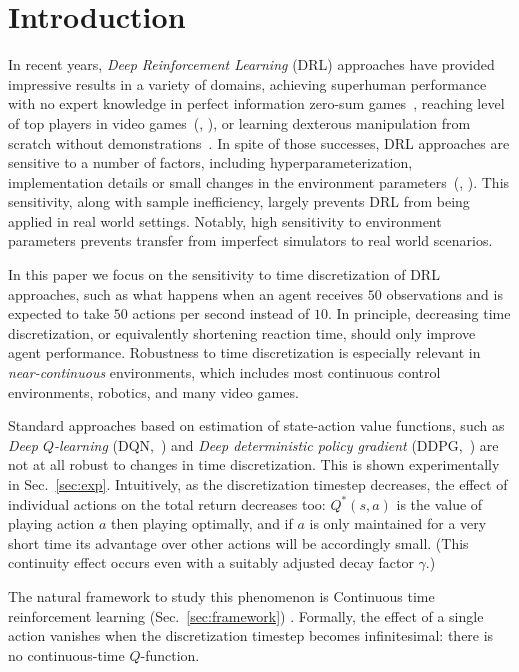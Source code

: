 
\section{Introduction}
\label{sec:intro}
In recent years, \emph{Deep Reinforcement Learning} (DRL) approaches have
provided impressive results in a variety of domains, achieving superhuman
performance with no expert knowledge in perfect information zero-sum
games~\cite{alphazero}, reaching level of top players in video
games~(\citealt{openai_five}, \citealt{dqn}), or learning dexterous manipulation
from scratch without demonstrations~\cite{hand_control}. 
In spite of those successes, DRL approaches are
sensitive to a number of factors, including hyperparameterization,
implementation details or small changes in the environment
parameters~(\citealt{drl_matter}, \citealt{drl_matter_bis}). This sensitivity,
along with sample inefficiency, largely prevents DRL from being applied in real
world settings. Notably, high sensitivity to environment parameters prevents
transfer from imperfect simulators to real world scenarios.

In this paper we focus on the sensitivity to time discretization of DRL
approaches, such as what happens when an agent receives $50$ observations
and is expected to take $50$ actions per second instead of $10$.
In principle, decreasing time discretization, or equivalently
shortening reaction time, should only improve agent performance.
Robustness to time discretization is especially relevant in
\emph{near-continuous} environments, which includes most continuous
control environments, robotics, and many video games.  

Standard approaches based on estimation of state-action
value functions, such as
\emph{Deep $Q$-learning} (DQN,~\citealt{dqn}) and \emph{Deep deterministic policy
gradient} (DDPG,~\citealt{ddpg}) are not at all robust to changes in time discretization. This is shown experimentally in Sec.~\ref{sec:exp}. 
Intuitively, as the discretization timestep
decreases, the effect of individual actions on the total return decreases
too: $Q^*(s,a)$ is the value of playing action $a$ then playing optimally,
and if $a$ is only maintained for a very short time its advantage over
other actions will be accordingly small. (This continuity effect occurs even with a
suitably adjusted decay factor $\gamma$.)

The natural framework to study this phenomenon is Continuous time
reinforcement learning (Sec.~\ref{sec:framework}) \cite{cont_rl,
adv_upd}. Formally, the effect of a single action vanishes when the
discretization timestep becomes infinitesimal: there is no
continuous-time $Q$-function. 

